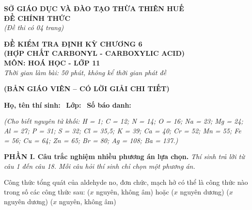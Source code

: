 \documentclass[12pt,a4paper]{article}
\begin{document}
\thispagestyle{firstpage}

\noindent
\begin{minipage}[t]{0.44\textwidth}
	\centering\fontsize{10pt}{12pt}\selectfont
	\textbf{SỞ GIÁO DỤC VÀ ĐÀO TẠO THỪA THIÊN HUẾ}\\
	\textbf{ĐỀ CHÍNH THỨC}\\
	\textit{(Đề thi có 04 trang)}
\end{minipage}\hfill
\begin{minipage}[t]{0.54\textwidth}
	\centering\fontsize{10.5pt}{13pt}\selectfont
	\textbf{ĐỀ KIỂM TRA ĐỊNH KỲ CHƯƠNG 6}\\
	\textbf{(HỢP CHẤT CARBONYL - CARBOXYLIC ACID)}\\
	\textbf{MÔN: HOÁ HỌC - LỚP 11}\\
	\textit{Thời gian làm bài: 50 phút, không kể thời gian phát đề}
	
	\smallskip
\end{minipage}

\smallskip
\begin{center}
	{\color{hfRed}\textbf{\large (BẢN GIÁO VIÊN -- CÓ LỜI GIẢI CHI TIẾT)}}
\end{center}

\smallskip
\noindent\hrulefill
\smallskip

\noindent\textbf{Họ, tên thí sinh:} \dotfill\ \textbf{Lớp:} \dotfill\ \textbf{Số báo danh:} \dotfill

\smallskip
\noindent\textit{(Cho biết nguyên tử khối: H = 1; C = 12; N = 14; O = 16; Na = 23; Mg = 24; Al = 27; P = 31; S = 32; Cl = 35,5; K = 39; Ca = 40; Cr = 52; Mn = 55; Fe = 56; Cu = 64; Zn = 65; Br = 80; Ag = 108; Ba = 137.)}

\smallskip
\noindent\textbf{\large PHẦN I. Câu trắc nghiệm nhiều phương án lựa chọn.}
\textit{Thí sinh trả lời từ câu 1 đến câu 18. Mỗi câu hỏi thí sinh chỉ chọn một phương án.}
\vspace{0.2cm}

\begin{ex}
Công thức tổng quát của aldehyde no, đơn chức, mạch hở có thể là công thức nào trong số các công thức sau:
\choice
{\True {} ($x$ nguyên, không âm) hoặc  ($x$ nguyên dương)}
{ ($x$ nguyên dương)}
{ ($x$ nguyên, không âm)}
{}

\end{ex}
\end{document}

